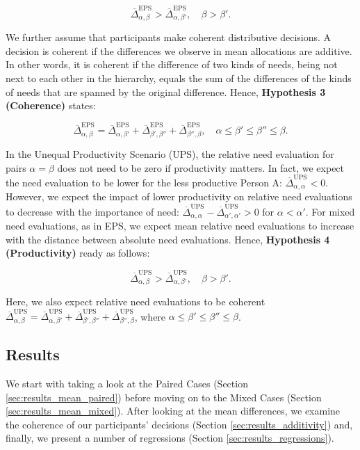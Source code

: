 \documentclass[egregdoesnotlikesansseriftitles]{scrartcl}
\begin{document}
\begin{equation}
   \overline{\Delta}^\text{EPS}_{\alpha,\beta}>\overline{\Delta}^\text{EPS}_{\alpha,\beta'},\quad\beta>\beta'.
\end{equation}

\noindent We further assume that participants make coherent distributive decisions.
A decision is coherent if the differences we observe in mean allocations are additive.
In other words, it is coherent if the difference of two kinds of needs, being not next to each other in the hierarchy, equals the sum of the differences of the kinds of needs that are spanned by the original difference.
Hence, \textbf{Hypothesis 3 (Coherence)} states:

\begin{equation}
   \overline{\Delta}^\text{EPS}_{\alpha,\beta}=\overline{\Delta}^\text{EPS}_{\alpha,\beta'}+\overline{\Delta}^\text{EPS}_{\beta',\beta''}+\overline{\Delta}^\text{EPS}_{\beta'',\beta},\quad\alpha\le\beta'\le\beta''\le\beta.
\end{equation}

\noindent In the Unequal Productivity Scenario (UPS), the relative need evaluation for pairs $\alpha=\beta$ does not need to be zero if productivity matters.
In fact, we expect the need evaluation to be lower for the less productive Person A: $\overline{\Delta}^\text{UPS}_{\alpha,\alpha}<0$.
However, we expect the impact of lower productivity on relative need evaluations to decrease with the importance of need: $\overline{\Delta}^\text{UPS}_{\alpha,\alpha}-\overline{\Delta}^\text{UPS}_{\alpha',\alpha'}>0$ for $\alpha<\alpha'$.
For mixed need evaluations, as in EPS, we expect mean relative need evaluations to increase with the distance between absolute need evaluations.
Hence, \textbf{Hypothesis 4 (Productivity)} ready as follows:

\begin{equation}
   \overline{\Delta}^\text{UPS}_{\alpha,\beta}>\overline{\Delta}^\text{UPS}_{\alpha,\beta'},\quad\beta>\beta'.
\end{equation}

\noindent Here, we also expect relative need evaluations to be coherent $\overline{\Delta}^\text{UPS}_{\alpha,\beta}=\overline{\Delta}^\text{UPS}_{\alpha,\beta'}+\overline{\Delta}^\text{UPS}_{\beta',\beta''}+\overline{\Delta}^\text{UPS}_{\beta'',\beta}$, where $\alpha\le\beta'\le\beta''\le\beta$.


\subsection{Results}\label{sec:results}
We start with taking a look at the Paired Cases (Section \ref{sec:results_mean_paired}) before moving on to the Mixed Cases (Section \ref{sec:results_mean_mixed}).
After looking at the mean differences, we examine the coherence of our participants' decisions (Section \ref{sec:results_additivity}) and, finally, we present a number of regressions (Section \ref{sec:results_regressions}).
\end{document}
